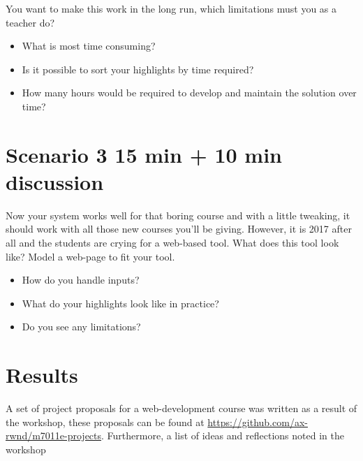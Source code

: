 You want to make this work in the long run, which limitations must you as a teacher do?
\begin{itemize}
\item What is most time consuming?
\item Is it possible to sort your highlights by time required?
\item How many hours would be required to develop and maintain the solution over time?
\end{itemize} 

\section*{Scenario 3 15 min + 10 min discussion}
Now your system works well for that boring course and with a little tweaking, it should work with all those new courses you'll be giving. However, it is 2017 after all and the students are crying for a web-based tool. What does this tool look like? Model a web-page to fit your tool.

\begin{itemize}
\item How do you handle inputs?
\item What do your highlights look like in practice?
\item Do you see any limitations?
\end{itemize} 


\section*{Results}
A set of project proposals for a web-development course was written as a result of the workshop, these proposals can be found at \url{https://github.com/ax-rwnd/m7011e-projects}. Furthermore, a list of ideas and reflections noted in the workshop

